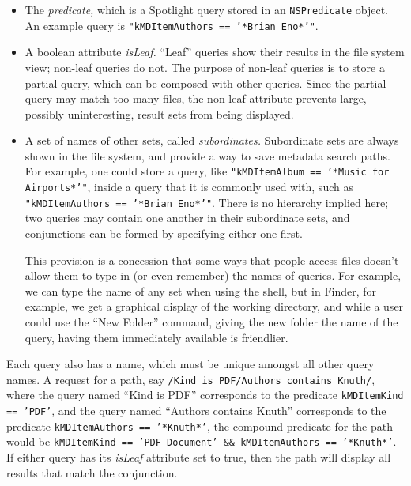 \documentclass{article}
\begin{document}
\begin{itemize}
\item The \emph{predicate,} which is a Spotlight query stored in an
  \texttt{NSPredicate} object. An example query is
  \texttt{"kMDItemAuthors == '*Brian Eno*'"}.

\item A boolean attribute \emph{isLeaf.} ``Leaf'' queries show their
  results in the file system view; non-leaf queries do not. The
  purpose of non-leaf queries is to store a partial query, which can
  be composed with other queries. Since the partial query may match
  too many files, the non-leaf attribute prevents large, possibly
  uninteresting, result sets from being displayed.

\item A set of names of other sets, called \emph{subordinates.}
  Subordinate sets are always shown in the file system, and provide a
  way to save metadata search paths. For example, one could store a
  query, like \texttt{"kMDItemAlbum == '*Music for Airports*'"}, inside
  a query that it is commonly used with, such as
  \texttt{"kMDItemAuthors == '*Brian Eno*'"}. There is no hierarchy
  implied here; two queries may contain one another in their
  subordinate sets, and conjunctions can be formed by specifying
  either one first.

  This provision is a concession that some ways that people access
  files doesn't allow them to type in (or even remember) the names of
  queries. For example, we can type the name of any set when using the
  shell, but in Finder, for example, we get a graphical display of the
  working directory, and while a user could use the ``New Folder''
  command, giving the new folder the name of the query, having them
  immediately available is friendlier.
\end{itemize}

Each query also has a name, which must be unique amongst all other
query names. A request for a path, say \texttt{/Kind is PDF/Authors
  contains Knuth/}, where the query named ``Kind is PDF'' corresponds
to the predicate \texttt{kMDItemKind == 'PDF'}, and the query named
``Authors contains Knuth'' corresponds to the predicate
\texttt{kMDItemAuthors == '*Knuth*'}, the compound predicate for the
path would be \texttt{kMDItemKind == 'PDF Document' \&\&
  kMDItemAuthors == '*Knuth*'}. If either query has its
\textit{isLeaf} attribute set to true, then the path will display all
results that match the conjunction.
\end{document}
